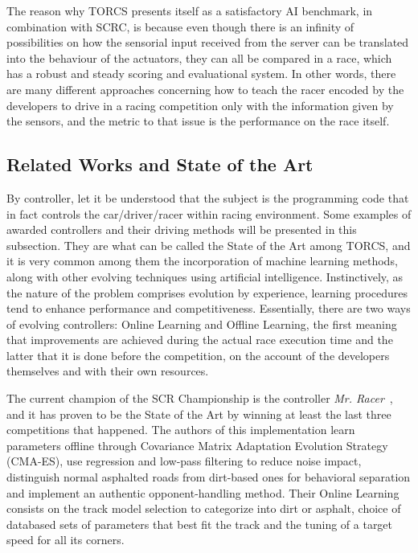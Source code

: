 	The reason why TORCS presents itself as a satisfactory AI benchmark, in combination with SCRC, is because even
	though there is an infinity of possibilities on how the sensorial input received from the server can be
	translated into the behaviour of the actuators, they can all be compared in a race, which has a robust and steady
	scoring and evaluational system. In other words, there are many different approaches concerning how to teach the
	racer encoded by the developers to drive in a racing competition only with the information given by the sensors,
	and the metric to that issue is the performance on the race itself.

\subsection{Related Works and State of the Art} \label{subsec:Related}
	
	By controller, let it be understood that the subject is the programming code that in fact controls the
	car/driver/racer within racing environment. Some examples of awarded controllers and their driving methods
	will be presented in this subsection. They are what can be called the State of the Art among TORCS, and it is
	very common among them the incorporation of machine learning methods, along with other evolving techniques
	using artificial intelligence. Instinctively, as the nature of the problem comprises evolution by experience,
	learning procedures tend to enhance performance and competitiveness. Essentially, there are two ways of
	evolving controllers: Online Learning and Offline Learning, the first meaning that improvements are achieved
	during the actual race execution time and the latter that it is done before the competition, on the account of
	the developers themselves and with their own resources.
	
	The current champion of the SCR Championship is the controller \emph{Mr. Racer}~\cite{MrRacer}, and it has
	proven to be the State of the Art by winning at least the last three competitions that happened. The authors
	of this implementation learn parameters offline through Covariance Matrix Adaptation Evolution Strategy
	(CMA-ES), use regression and low-pass filtering to reduce noise impact, distinguish normal asphalted roads
	from dirt-based ones for behavioral separation and implement an authentic opponent-handling method. Their
	Online Learning consists on the track model selection to categorize into dirt or asphalt, choice of databased
	sets of parameters that best fit the track and the tuning of a target speed for all its corners.
	
